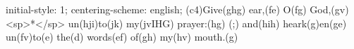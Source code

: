 initial-style: 1;
centering-scheme: english;
(c4)Give(ghg) ear,(fe) O(fg) God,(gv) <sp>*</sp> un(hji)to(jk) my(jvIHG) prayer:(hg) (;) and(hih) heark(g)en(ge) un(fv)to(e) the(d) words(ef) of(gh) my(hv) mouth.(g)
